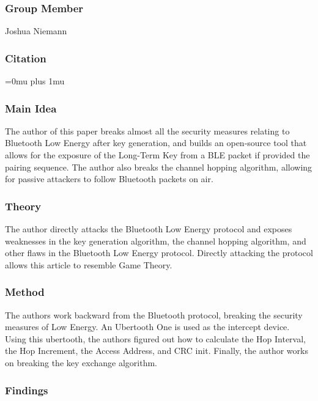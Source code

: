 \subsubsection{Group Member}

\noindent
Joshua Niemann

\noindent
\subsubsection{Citation}

\Urlmuskip=0mu plus 1mu\relax

\subsubsection{Main Idea}

\noindent
The author of this paper breaks almost all the security measures relating to Bluetooth Low Energy after key generation, and builds an open-source tool that allows for the exposure of the Long-Term Key from a BLE packet if provided the pairing sequence.  The author also breaks the channel hopping algorithm, allowing for passive attackers to follow Bluetooth packets on air.

\subsubsection{Theory}

\noindent
The author directly attacks the Bluetooth Low Energy protocol and exposes weaknesses in the key generation algorithm, the channel hopping algorithm, and other flaws in the Bluetooth Low Energy protocol.  Directly attacking the protocol allows this article to resemble Game Theory.

\subsubsection{Method}

\noindent
The authors work backward from the Bluetooth protocol, breaking the security measures of Low Energy.  An Ubertooth One is used as the intercept device.  Using this ubertooth, the authors figured out how to calculate the Hop Interval, the Hop Increment, the Access Address, and CRC init.  Finally, the author works on breaking the key exchange algorithm.

\subsubsection{Findings}

